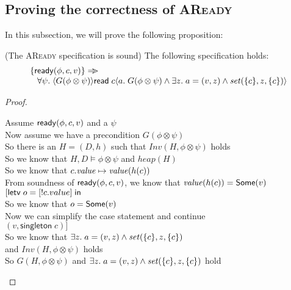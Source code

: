 \subsection{Proving the correctness of \textsc{AReady}}

In this subsection, we will prove the following proposition: 

\begin{prop*}{(The \textsc{AReady} specification is sound)}
The following specification holds: 
\begin{displaymath}
\begin{array}{l}
\{{\mathsf{ready}({\phi}, {c}, {v})}\} \Rightarrow\!\!\!> \\
\;\;\;\forall \psi.\; \langle{G(\phi \otimes \psi)}\rangle{\mathsf{read}\;c}\langle{a}.\;{G(\phi \otimes \psi) \land \exists z.\;a = (v, z) \land \mathit{set}(\{{c}\}, z, \{{c}\})}\rangle 
\end{array}
\end{displaymath}
\end{prop*}

\begin{proof}
\begin{tabbedproof}
\oo Assume $\mathsf{ready}({\phi}, {c}, {v})$ and a $\psi$ \\
\ooo Now assume we have a precondition $G(\phi \otimes \psi)$ \\
\ooo So there is an $H = (D,h)$ such that $\mathit{Inv}(H, \phi \otimes \psi)$ holds \\
\ooo So we know that $H, D \models \phi \otimes \psi$ and $\mathit{heap}(H)$ \\
\ooo So we know that $c.\mathit{value} \mapsto \mathit{value}(h(c))$ \\
\ooo From soundness of $\mathsf{ready}({\phi}, {c}, {v})$, we know that $\mathit{value}(h(c)) = \mathsf{Some}(v)$ \\
\ooo $[\mathsf{letv}\;o = [!c.value]\;\mathsf{in}\;$ \\
\ooo So we know that $o = \mathsf{Some}(v)$ \\
\ooo Now we can simplify the case statement and continue \\
\ooo $(v, \mathsf{singleton}\;c)]$ \\
\ooo So we know that $\exists z.\;a = (v, z) \land \mathit{set}(\{{c}\}, z, \{{c}\})$ \\
\oox and $\mathit{Inv}(H, \phi \otimes \psi)$ holds \\
\ooo So $G(H, \phi \otimes \psi)$ and $\exists z.\;a = (v, z) \land \mathit{set}(\{{c}\}, z, \{{c}\})$ hold
\end{tabbedproof}
\end{proof}

